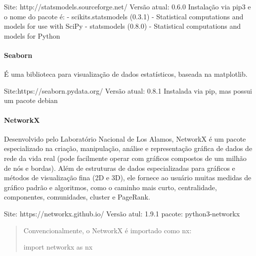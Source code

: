 \documentclass[11pt]{article}
\begin{document}
Site: http://statsmodels.sourceforge.net/ Versão atual: 0.6.0 Instalação
via pip3 e o nome do pacote é: - scikits.statsmodels (0.3.1) -
Statistical computations and models for use with SciPy - statsmodels
(0.8.0) - Statistical computations and models for Python

\paragraph{Seaborn}\label{seaborn}

É uma biblioteca para visualização de dados estatísticos, baseada na
matplotlib.

Site:https://seaborn.pydata.org/ Versão atual: 0.8.1 Instalada via pip,
mas possui um pacote debian

\paragraph{NetworkX }\label{networkx}

Desenvolvido pelo Laboratório Nacional de Los Alamos, NetworkX é um
pacote especializado na criação, manipulação, análise e representação
gráfica de dados de rede da vida real (pode facilmente operar com
gráficos compostos de um milhão de nós e bordas). Além de estruturas de
dados especializadas para gráficos e métodos de visualização fina (2D e
3D), ele fornece ao usuário muitas medidas de gráfico padrão e
algoritmos, como o caminho mais curto, centralidade, componentes,
comunidades, cluster e PageRank.

Site: https://networkx.github.io/ Versão atul: 1.9.1 pacote:
python3-networkx

\begin{quote}
Convencionalmente, o NetworkX é importado como nx:

import networkx as nx
\end{quote}
\end{document}
